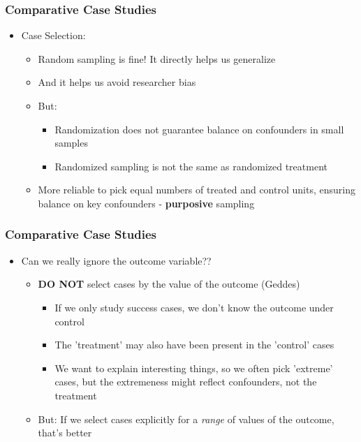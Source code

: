 \documentclass[xcolor=x11names,compress]{beamer}\usepackage[]{graphicx}\usepackage[]{color}
\renewcommand{\(}{\begin{columns}}
\renewcommand{\)}{\end{columns}}
\newcommand{\<}[1]{\begin{column}{#1}}
\renewcommand{\>}{\end{column}}
\begin{document}
\begin{frame}
\frametitle{Comparative Case Studies}
\begin{itemize}
\item Case Selection:
\pause
\begin{itemize}
\item Random sampling is fine! It directly helps us generalize
\pause
\item And it helps us avoid researcher bias
\pause
\item But:
\pause
\begin{itemize}
\item Randomization does not guarantee balance on confounders in small samples
\pause
\item Randomized sampling is not the same as randomized treatment
\end{itemize}
\item More reliable to pick equal numbers of treated and control units, ensuring balance on key confounders - \textbf{purposive} sampling
\end{itemize}
\end{itemize}
\end{frame}

\begin{frame}
\frametitle{Comparative Case Studies}
\begin{itemize}
\item Can we really ignore the outcome variable??
\pause
\begin{itemize}
\item \textbf{DO NOT} select cases by the value of the outcome (Geddes)
\begin{itemize}
\pause
\item If we only study success cases, we don't know the outcome under control
\pause
\item The 'treatment' may also have been present in the 'control' cases
\pause
\item We want to explain interesting things, so we often pick 'extreme' cases, but the extremeness might reflect confounders, not the treatment
\end{itemize}
\pause
\item But: If we select cases explicitly for a \textit{range} of values of the outcome, that's better
\end{itemize}
\end{itemize}
\end{frame}
\end{document}
